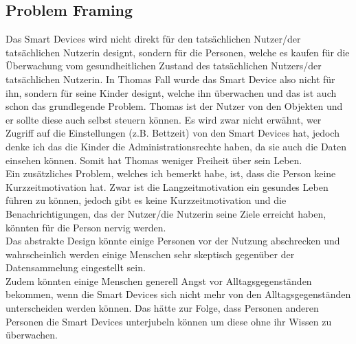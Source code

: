 \subsection{Problem Framing}
Das Smart Devices wird nicht direkt für den tatsächlichen Nutzer/der tatsächlichen Nutzerin designt, sondern für die Personen, welche es kaufen für die Überwachung vom gesundheitlichen Zustand des tatsächlichen Nutzers/der tatsächlichen Nutzerin. In Thomas Fall wurde das Smart Device also nicht für ihn, sondern für seine Kinder designt, welche ihn überwachen und das ist auch schon das grundlegende Problem. Thomas ist der Nutzer von den Objekten und er sollte diese auch selbst steuern können. Es wird zwar nicht erwähnt, wer Zugriff auf die Einstellungen (z.B. Bettzeit) von den Smart Devices hat, jedoch denke ich das die Kinder die Administrationsrechte haben, da sie auch die Daten einsehen können. Somit hat Thomas weniger Freiheit über sein Leben.\\
Ein zusätzliches Problem, welches ich bemerkt habe, ist, dass die Person keine Kurzzeitmotivation hat. Zwar ist die Langzeitmotivation ein gesundes Leben führen zu können, jedoch gibt es keine Kurzzeitmotivation und die Benachrichtigungen, das der Nutzer/die Nutzerin seine Ziele erreicht haben, könnten für die Person nervig werden. \\
Das abstrakte Design könnte einige Personen vor der Nutzung abschrecken und wahrscheinlich werden einige Menschen sehr skeptisch gegenüber der Datensammelung\cite{euroSkeptisch} eingestellt sein.\\
Zudem könnten einige Menschen generell Angst vor Alltagsgegenständen bekommen, wenn die Smart Devices sich nicht mehr von den Alltagsgegenständen unterscheiden werden können. Das hätte zur Folge, dass Personen anderen Personen die Smart Devices unterjubeln können um diese ohne ihr Wissen zu überwachen.
